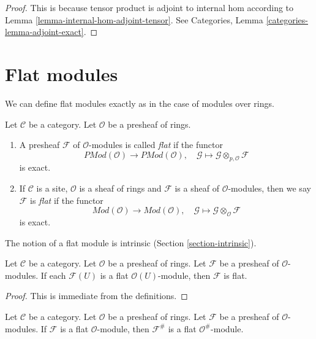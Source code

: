 \begin{proof}
This is because tensor product is adjoint to internal hom according
to Lemma \ref{lemma-internal-hom-adjoint-tensor}.
See Categories, Lemma \ref{categories-lemma-adjoint-exact}.
\end{proof}








\section{Flat modules}
\label{section-flat}

\noindent
We can define flat modules exactly as in the case of modules over rings.

\begin{definition}
\label{definition-flat}
Let $\mathcal{C}$ be a category.
Let $\mathcal{O}$ be a presheaf of rings.
\begin{enumerate}
\item A presheaf $\mathcal{F}$ of $\mathcal{O}$-modules is called
{\it flat} if the functor
$$
\textit{PMod}(\mathcal{O})
\longrightarrow
\textit{PMod}(\mathcal{O}), \quad
\mathcal{G} \mapsto \mathcal{G} \otimes_{p, \mathcal{O}} \mathcal{F}
$$
is exact.
\item If $\mathcal{C}$ is a site, $\mathcal{O}$ is a sheaf of rings
and $\mathcal{F}$ is a sheaf of $\mathcal{O}$-modules, then we
say $\mathcal{F}$ is {\it flat} if the functor
$$
\textit{Mod}(\mathcal{O})
\longrightarrow
\textit{Mod}(\mathcal{O}), \quad
\mathcal{G} \mapsto \mathcal{G} \otimes_{\mathcal{O}} \mathcal{F}
$$
is exact.
\end{enumerate}
\end{definition}

\noindent
The notion of a flat module is intrinsic (Section \ref{section-intrinsic}).

\begin{lemma}
\label{lemma-flatness-presheaves}
Let $\mathcal{C}$ be a category.
Let $\mathcal{O}$ be a presheaf of rings.
Let $\mathcal{F}$ be a presheaf of $\mathcal{O}$-modules.
If each $\mathcal{F}(U)$ is a flat $\mathcal{O}(U)$-module,
then $\mathcal{F}$ is flat.
\end{lemma}

\begin{proof}
This is immediate from the definitions.
\end{proof}

\begin{lemma}
\label{lemma-flatness-sheafification}
Let $\mathcal{C}$ be a category.
Let $\mathcal{O}$ be a presheaf of rings.
Let $\mathcal{F}$ be a presheaf of $\mathcal{O}$-modules.
If $\mathcal{F}$ is a flat $\mathcal{O}$-module, then
$\mathcal{F}^\#$ is a flat $\mathcal{O}^\#$-module.
\end{lemma}

